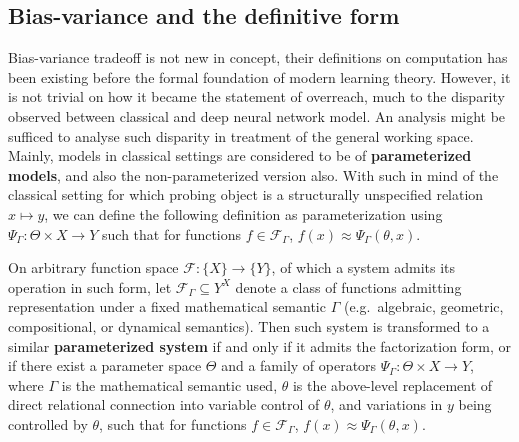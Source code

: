 \subsection{Bias-variance and the definitive form}

Bias-variance tradeoff is not new in concept, their definitions on computation has been existing before the formal foundation of modern learning theory. However, it is not trivial on how it became the statement of overreach, much to the disparity observed between classical and deep neural network model. An analysis might be sufficed to analyse such disparity in treatment of the general working space. Mainly, models in classical settings are considered to be of \textbf{parameterized models}, and also the non-parameterized version also. With such in mind of the classical setting for which probing object is a structurally unspecified relation $x\mapsto y$, we can define the following definition as parameterization using $\Psi_{\Gamma} : \Theta \times X \to Y$ such that for functions $f \in \mathcal F_\Gamma$, $f(x) \approx \Psi_{\Gamma}(\theta, x)$.
\begin{definition}[Parameterization]\label{def:paramterization}
    On arbitrary function space $\mathcal{F}:\{X\}\to \{Y\}$, of which a system admits its operation in such form, let $\mathcal F_\Gamma \subseteq Y^X$ denote a class of functions admitting representation under a fixed mathematical semantic $\Gamma$ (e.g.\ algebraic, geometric, compositional, or dynamical semantics). Then such system is transformed to a similar \textbf{parameterized system} if and only if it admits the factorization form, or if there exist a parameter space $\Theta$ and a family of operators $\Psi_{\Gamma} : \Theta \times X \to Y$, where $\Gamma$ is the mathematical semantic used, $\theta$ is the above-level replacement of direct relational connection into variable control of $\theta$, and variations in $y$ being controlled by $\theta$, such that for functions $f \in \mathcal F_\Gamma$, $f(x) \approx \Psi_{\Gamma}(\theta, x)$.
\end{definition}

